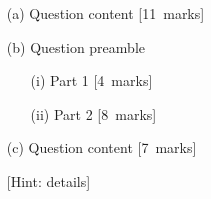 \begin{itemize}
\item[(a)]
Question content
[11~marks]

\item[(b)]
Question preamble
\begin{itemize}
\item[(i)]
Part 1
[4~marks]
\item[(ii)] Part 2
[8~marks]
\end{itemize}

\item[(c)]
Question content
[7~marks]

\begin{center}
[Hint: details]
\end{center}
\end{itemize}
